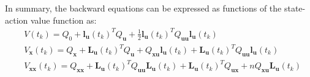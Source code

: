 \documentclass[11pt]{homework}
\renewcommand{\vec}[1]{\ensuremath{\boldsymbol{#1}}}
\begin{document}
\begin{arabicparts}
		In summary, the backward equations can be expressed as functions of the state-action value function as: 
			\begin{align*}
				& V(t_k) =  Q_{0} + \vec{l}_{\vec{u}}(t_{k})^{T}Q_{\vec{u}} + \frac{1}{2}\vec{l}_{\vec{u}}(t_{k})^{T}Q_{\vec{uu}}\vec{l}_{\vec{u}}(t_{k}) \\
				& V_{\vec{x}}(t_{k}) = Q_{\vec{x}} + \vec{L}_{\vec{u}}(t_{k})^{T}Q_{\vec{u}} + Q_{\vec{xu}}\vec{l}_{\vec{u}}(t_{k}) + \vec{L}_{\vec{u}}(t_{k})^{T}Q_{\vec{uu}}\vec{l}_{\vec{u}}(t_{k})\\
				& V_{\vec{xx}}(t_{k}) = Q_{\vec{xx}} + \vec{L}_{\vec{u}}(t_{k})^{T}Q_{\vec{uu}}\vec{L}_{\vec{u}}(t_{k}) + \vec{L}_{\vec{u}}(t_{k})^{T}Q_{\vec{ux}} + nQ_{\vec{xu}}\vec{L}_{\vec{u}}(t_{k}) \\
			\end{align*}
		
		
	\end{arabicparts}
\end{document}
